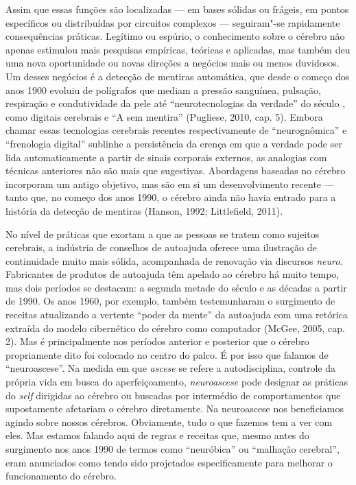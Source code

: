 Assim que essas funções são localizadas --- em bases sólidas ou
frágeis, em pontos específicos ou distribuídas por circuitos complexos
--- seguiram"-se rapidamente consequências práticas. Legítimo ou espúrio,
o conhecimento sobre o cérebro não apenas estimulou mais pesquisas
empíricas, teóricas e aplicadas, mas também deu uma nova oportunidade ou
novas direções a negócios mais ou menos duvidosos. Um desses negócios é
a detecção de mentiras automática, que desde o começo dos anos 1900
evoluiu de polígrafos que mediam a pressão sanguínea, pulsação,
respiração e condutividade da pele até ``neurotecnologias da verdade''
do século , como digitais cerebrais e ``A  sem mentira'' (Pugliese, 2010,
cap. 5). Embora chamar essas tecnologias cerebrais recentes
respectivamente de ``neurognômica'' e ``frenologia digital'' sublinhe a
persistência da crença em que a verdade pode ser lida automaticamente a
partir de sinais corporais externos, as analogias com técnicas
anteriores não são mais que sugestivas. Abordagens baseadas no cérebro
incorporam um antigo objetivo, mas são em si um desenvolvimento recente
--- tanto que, no começo dos anos 1990, o cérebro ainda não havia entrado
para a história da detecção de mentiras (Hanson, 1992; Littlefield,
2011).

No nível de práticas que exortam a que as pessoas se tratem como
sujeitos cerebrais, a indústria de conselhos de autoajuda oferece uma
ilustração de continuidade muito mais sólida, acompanhada de renovação
via discursos \emph{neuro}. Fabricantes de produtos de autoajuda têm
apelado ao cérebro há muito tempo, mas dois períodos se destacam: a
segunda metade do século  e as décadas a partir de 1990. Os anos
1960, por exemplo, também testemunharam o surgimento de receitas
atualizando a vertente ``poder da mente'' da autoajuda com uma retórica
extraída do modelo cibernético do cérebro como computador (McGee,
2005, cap. 2). Mas é principalmente nos períodos anterior e posterior
que o cérebro propriamente dito foi colocado no centro do palco. É por
isso que falamos de ``neuroascese''. Na medida em que \emph{ascese} se
refere a autodisciplina, controle da própria vida em busca do
aperfeiçoamento, \emph{neuroascese} pode designar as práticas do \emph{self}
dirigidas ao cérebro ou buscadas por intermédio de comportamentos que
supostamente afetariam o cérebro diretamente. Na neuroascese nos
beneficiamos agindo sobre nossos cérebros. Obviamente, tudo o que
fazemos tem a ver com eles. Mas estamos falando aqui de regras e
receitas que, mesmo antes do surgimento nos anos 1990 de termos como
``neuróbica'' ou ``malhação cerebral'', eram anunciados como tendo sido
projetados especificamente para melhorar o funcionamento do cérebro.

